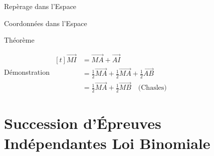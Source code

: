 \documentclass{coursbook}
\begin{document}
\begin{Gpartie}{Repèrage dans l'Espace}
\begin{Spartie}{Coordonnées dans l'Espace}
\begin{SSpartie}{Théorème}
                \begin{SSSpartie}{Démonstration} 
                    $\begin{aligned}[t]
                        \overrightarrow{MI}&=\overrightarrow{MA}+\overrightarrow{AI} \\
                        &=\tfrac{1}{2}\overrightarrow{MA}+\tfrac{1}{2}\overrightarrow{MA}+\tfrac{1}{2}\overrightarrow{AB} \\
                        &=\tfrac{1}{2}\overrightarrow{MA}+\tfrac{1}{2}\overrightarrow{MB}\quad\text{(Chasles)}
                    \end{aligned}$
                \end{SSSpartie}
            \end{SSpartie}
        \end{Spartie}
    \end{Gpartie}








    \chapter{Succession d'Épreuves Indépendantes Loi Binomiale}
\end{document}
